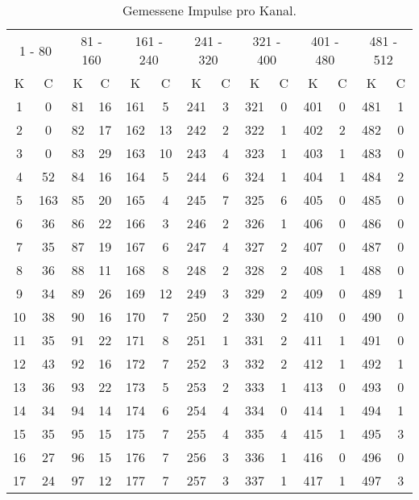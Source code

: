 \begin{table}
 \centering
 \caption{Gemessene Impulse pro Kanal.}
 \label{tab:Spektrum}
 \begin{tabular}{c|c||c|c||c|c||c|c||c|c||c|c||c|c}
 \toprule
 \multicolumn{2}{c}{1 - 80}    & \multicolumn{2}{c}{81 - 160}  &
 \multicolumn{2}{c}{161 - 240} & \multicolumn{2}{c}{241 - 320} &
 \multicolumn{2}{c}{321 - 400} & \multicolumn{2}{c}{401 - 480} &
 \multicolumn{2}{c}{481 - 512} \\
\cmidrule(lr){1-2}\cmidrule(lr){3-4}\cmidrule(lr){5-6}\cmidrule(lr){7-8}\cmidrule(lr){9-10}\cmidrule(lr){11-12}\cmidrule(lr){13-14}
 K & C & K & C & K & C & K & C & K & C & K & C & K & C \\
 \midrule
 1  & 0   & 81  & 16 & 161 &  5 & 241 &  3 & 321 & 0 & 401 & 0 & 481 & 1\\
 2  & 0   & 82  & 17 & 162 & 13 & 242 &  2 & 322 & 1 & 402 & 2 & 482 & 0\\
 3  & 0   & 83  & 29 & 163 & 10 & 243 &  4 & 323 & 1 & 403 & 1 & 483 & 0\\
 4  & 52  & 84  & 16 & 164 &  5 & 244 &  6 & 324 & 1 & 404 & 1 & 484 & 2\\
 5  & 163 & 85  & 20 & 165 &  4 & 245 &  7 & 325 & 6 & 405 & 0 & 485 & 0\\
 6  & 36  & 86  & 22 & 166 &  3 & 246 &  2 & 326 & 1 & 406 & 0 & 486 & 0\\
 7  & 35  & 87  & 19 & 167 &  6 & 247 &  4 & 327 & 2 & 407 & 0 & 487 & 0\\
 8  & 36  & 88  & 11 & 168 &  8 & 248 &  2 & 328 & 2 & 408 & 1 & 488 & 0\\
 9  & 34  & 89  & 26 & 169 & 12 & 249 &  3 & 329 & 2 & 409 & 0 & 489 & 1\\
 10 & 38  & 90  & 16 & 170 &  7 & 250 &  2 & 330 & 2 & 410 & 0 & 490 & 0\\
 11 & 35  & 91  & 22 & 171 &  8 & 251 &  1 & 331 & 2 & 411 & 1 & 491 & 0\\
 12 & 43  & 92  & 16 & 172 &  7 & 252 &  3 & 332 & 2 & 412 & 1 & 492 & 1\\
 13 & 36  & 93  & 22 & 173 &  5 & 253 &  2 & 333 & 1 & 413 & 0 & 493 & 0\\
 14 & 34  & 94  & 14 & 174 &  6 & 254 &  4 & 334 & 0 & 414 & 1 & 494 & 1\\
 15 & 35  & 95  & 15 & 175 &  7 & 255 &  4 & 335 & 4 & 415 & 1 & 495 & 3\\
 16 & 27  & 96  & 15 & 176 &  7 & 256 &  3 & 336 & 1 & 416 & 0 & 496 & 0\\
 17 & 24  & 97  & 12 & 177 &  7 & 257 &  3 & 337 & 1 & 417 & 1 & 497 & 3\\

\end{tabular}
\end{table}
